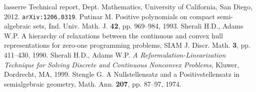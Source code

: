 \documentclass[11pt]{article}
\numberwithin{equation}{section}
\begin{document}
\begin{thebibliography}{lasserre}
Technical report, Dept. Mathematics, University of California, San Diego, 2012. {{\tt arXiv:1206.0319}}.
Putinar M. Positive polynomials on compact semi-algebraic sets, Ind. Univ. Math. J. {\bf 42}, pp. 969--984, 1993.
Sherali H.D., Adams W.P. A hierarchy of relaxations between the continuous and convex hull representations for zero-one programming problems,
 SIAM J. Discr. Math. {\bf 3}, pp. 411--430, 1990.
Sherali H.D.,  Adams W.P. {\em A {R}eformulation-{L}inearization {T}echnique for  Solving Discrete and Continuous Nonconvex Problems},
Kluwer, Dordrecht, MA, 1999.
Stengle G. A {N}ullstellensatz and a {P}ositivstellensatz in semialgebraic geometry, Math. Ann. {\bf 207}, pp. 87--97, 1974.
 \end{thebibliography}
\end{document}
